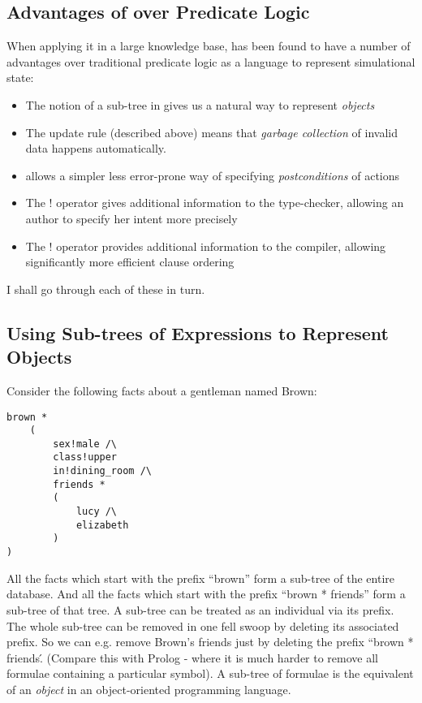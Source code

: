 \subsection{Advantages of \ELKR{} over Predicate Logic}

When applying it in a large knowledge base, \ELFULL{} has been found to have a number of advantages over traditional predicate logic as a language to represent simulational state:
\begin{itemize}
\item
The notion of a sub-tree in \ELABR{} gives us a natural way to represent \emph{objects}
\item
The update rule (described above) means that \emph{garbage collection} of invalid data happens automatically.
\item
\ELABR{} allows a simpler less error-prone way of specifying \emph{postconditions} of actions
\item
The $!$ operator gives additional information to the type-checker, allowing an author to specify her intent more precisely
\item
The $!$ operator provides additional information to the compiler, allowing significantly more efficient clause ordering
\end{itemize}
I shall go through each of these in turn.

\subsection{Using Sub-trees of Expressions to Represent Objects}
Consider the following facts about a gentleman named Brown:
\begin{verbatim}
brown *
    (
        sex!male /\
        class!upper
        in!dining_room /\
        friends *
        (
            lucy /\
            elizabeth
        )
)
\end{verbatim}
All the facts which start with the prefix ``brown'' form a sub-tree of the entire database.
And all the facts which start with the prefix ``brown * friends'' form a sub-tree of that tree.
A sub-tree can be treated as an individual via its prefix.
The whole sub-tree can be removed in one fell swoop by deleting its associated prefix.
So we can e.g. remove Brown's friends just by deleting the prefix ``brown * friends\'.
(Compare this with Prolog - where it is much harder to remove all formulae containing a particular symbol).
A sub-tree of formulae is the \ELKR{} equivalent of an \emph{object} in an object-oriented programming language.

